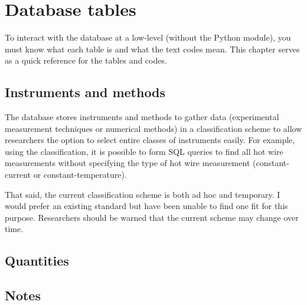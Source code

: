 %
\chapter{Database tables}

To interact with the database at a low-level (without the Python module), you
must know what each table is and what the text codes mean.  This chapter serves
as a quick reference for the tables and codes.


\section{Instruments and methods}

The database stores instruments and methods to gather data (experimental
measurement techniques or numerical methods) in a classification scheme to
allow researchers the option to select entire classes of instruments easily.
For example, using the classification, it is possible to form SQL queries to
find all hot wire measurements without specifying the type of hot wire
measurement (constant-current or constant-temperature).

That said, the current classification scheme is both ad hoc and temporary.  I
would prefer an existing standard but have been unable to find one fit for this
purpose.  Researchers should be warned that the current scheme may change over
time.




\section{Quantities}




\section{Notes}


